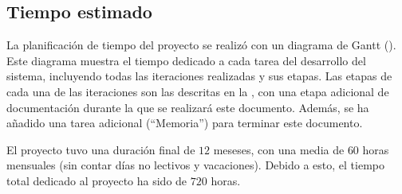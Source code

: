 \subsection{Tiempo estimado}

La planificación de tiempo del proyecto se realizó con un diagrama de Gantt
\parencite{gantt} (). Este diagrama muestra el tiempo dedicado a
cada tarea del desarrollo del sistema, incluyendo todas las iteraciones
realizadas y sus etapas. Las etapas de cada una de las iteraciones son las
descritas en la , con una etapa adicional de
documentación durante la que se realizará este documento. Además, se ha añadido
una tarea adicional (``Memoria'') para terminar este documento.

El proyecto tuvo una duración final de $12$ meseses, con una media de $60$ horas
mensuales (sin contar días no lectivos y vacaciones). Debido a esto, el tiempo
total dedicado al proyecto ha sido de $720$ horas.

